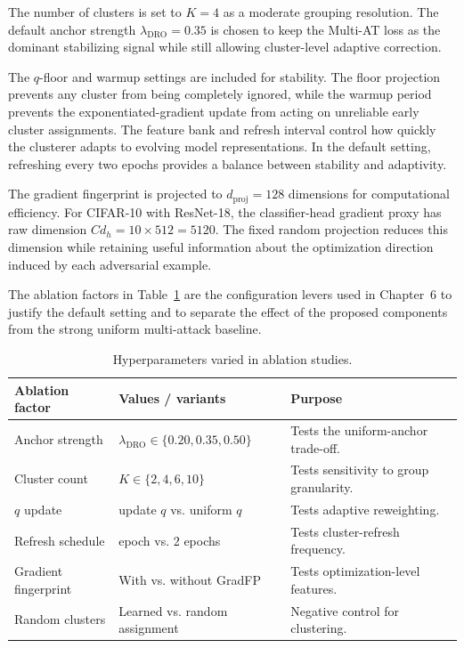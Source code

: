 The number of clusters is set to $K=4$ as a moderate grouping resolution. The default anchor
strength $\lambda_{\mathrm{DRO}}=0.35$ is chosen to keep the Multi-AT loss as
the dominant stabilizing signal while still allowing cluster-level adaptive correction.

The $q$-floor and warmup settings are included for stability. The floor projection
prevents any cluster from being completely ignored, while the warmup period prevents the
exponentiated-gradient update from acting on unreliable early cluster assignments. The
feature bank and refresh interval control how quickly the clusterer adapts to evolving
model representations. In the default setting, refreshing every two epochs provides a
balance between stability and adaptivity.

The gradient fingerprint is projected to $d_{\mathrm{proj}}=128$ dimensions for
computational efficiency. For CIFAR-10 with ResNet-18, the classifier-head gradient proxy
has raw dimension $C d_h = 10 \times 512 = 5120$. The fixed random projection reduces
this dimension while retaining useful information about the optimization direction
induced by each adversarial example.

The ablation factors in Table~\ref{tab:ch5_ablation_hyperparams} are the configuration
levers used in Chapter~6 to justify the default setting and to separate the effect of
the proposed components from the strong uniform multi-attack baseline.

\begin{table}[H]
\centering
\caption{Hyperparameters varied in ablation studies.}
\label{tab:ch5_ablation_hyperparams}
\footnotesize
\setlength{\tabcolsep}{4pt}
\renewcommand{\arraystretch}{1.08}
\begin{tabularx}{\textwidth}{@{}
>{\raggedright\arraybackslash}p{}
>{\raggedright\arraybackslash}p{}
>{\raggedright\arraybackslash}X
@{}}
\toprule
Ablation factor & Values / variants & Purpose \\
\midrule

Anchor strength
& $\lambda_{\mathrm{DRO}} \in \{0.20, 0.35, 0.50\}$
& Tests the uniform-anchor trade-off. \\

Cluster count
& $K \in \{2,4,6,10\}$
& Tests sensitivity to group granularity. \\

$q$ update
& update $q$  vs. uniform $q$
& Tests adaptive reweighting. \\

Refresh schedule
& 1 epoch vs. 2 epochs
& Tests cluster-refresh frequency. \\

Gradient fingerprint
& With vs. without GradFP
& Tests optimization-level features. \\

Random clusters
& Learned vs. random assignment
& Negative control for clustering. \\

\bottomrule
\end{tabularx}
\end{table}
